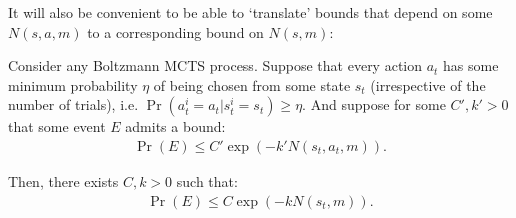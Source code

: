     It will also be convenient to be able to `translate' bounds that depend on some $N(s,a,m)$ to a corresponding bound on $N(s,m)$:
    \begin{lemma} \label{lem:sa_to_s}
        Consider any Boltzmann MCTS process. Suppose that every action $a_t$ has some minimum probability $\eta$ of being chosen from some state $s_t$ (irrespective of the number of trials), i.e. $\Pr(a^i_t=a_t|s^i_t=s_t)\geq\eta$. And suppose for some $C',k'>0$ that some event $E$ admits a bound:
        \begin{align}
            \Pr(E) \leq C'\exp(-k'N(s_t,a_t,m)). \label{eq:sa_to_s_assume_bound}
        \end{align}
        
        Then, there exists $C,k>0$ such that:
        \begin{align}
            \Pr(E) \leq C\exp(-k N(s_t,m)). 
        \end{align}
    \end{lemma}
    
